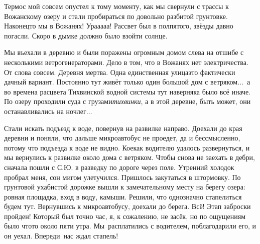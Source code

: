 Термос мой совсем опустел к тому моменту, как мы свернули с трассы к Вожанскому озеру и стали пробираться по довольно разбитой грунтовке. Наконец\sdash то мы в Вожанях! Ура\sdash а\sdash а\sdash а\sdash а! Рассвет был в полпятого, звёзды давно погасли. Скоро в дымке должно было взойти солнце. 

Мы въехали в деревню и были поражены огромным домом слева на отшибе с несколькими ветрогенераторами. Дело в том, что в Вожанях нет электричества. От слова совсем. Деревня мертва. Одна единственная улица\mdash это фактически дачный вариант. Постоянно тут живёт только один большой дом с ветряком$\ldots$~а во времена расцвета Тихвинской водной системы тут наверняка было всё иначе. По озеру проходили суда с грузами\mdash \textit{тихвинки}, а в этой деревне, быть может, они останавливались на ночлег$\ldots$ 

Стали искать подъезд к воде, повернув на развилке направо. Доехали до края деревни и поняли, что дальше микроавтобус не проедет, да и бессмысленно, потому что подъезда к воде не видно. Кое\sdash как водителю удалось развернуться, и мы вернулись к развилке около дома с ветряком. Чтобы снова не заехать в дебри, сначала пошли с С.Ю. в разведку по дороге через поле. Утренний холодок пробрал меня, сон мигом улетучился. Пришлось закутаться в штормовку. По грунтовой ухабистой дорожке вышли к замечательному месту на берегу озера: ровная площадка, вход в воду, камыши. Решили, что однозначно стапелиться будем тут. Вернувшись к микроавтобусу, доехали до берега. Всё! Этап заброски пройден! Который был точно час, я, к сожалению, не засёк, но по ощущениям было что\sdash то около пяти утра. Мы~расплатились с водителем, поблагодарили его, и он уехал. Впереди~нас ждал стапель!

\begin{center}
\end{center}
